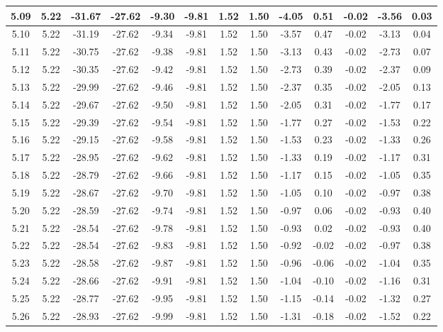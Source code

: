 \begin{table}[htbp]
\begin{adjustbox}{angle=90}
\begin{tabular}{|c|c|c|c|c|c|c|c|c|c|c|c|c|}
 5.09 & 5.22 & -31.67 & -27.62 & -9.30 & -9.81 & 1.52 & 1.50 & -4.05 & 0.51 & -0.02 & -3.56 & 0.03\\ \hline
 5.10 & 5.22 & -31.19 & -27.62 & -9.34 & -9.81 & 1.52 & 1.50 & -3.57 & 0.47 & -0.02 & -3.13 & 0.04\\ \hline
 5.11 & 5.22 & -30.75 & -27.62 & -9.38 & -9.81 & 1.52 & 1.50 & -3.13 & 0.43 & -0.02 & -2.73 & 0.07\\ \hline
 5.12 & 5.22 & -30.35 & -27.62 & -9.42 & -9.81 & 1.52 & 1.50 & -2.73 & 0.39 & -0.02 & -2.37 & 0.09\\ \hline
 5.13 & 5.22 & -29.99 & -27.62 & -9.46 & -9.81 & 1.52 & 1.50 & -2.37 & 0.35 & -0.02 & -2.05 & 0.13\\ \hline
 5.14 & 5.22 & -29.67 & -27.62 & -9.50 & -9.81 & 1.52 & 1.50 & -2.05 & 0.31 & -0.02 & -1.77 & 0.17\\ \hline
 5.15 & 5.22 & -29.39 & -27.62 & -9.54 & -9.81 & 1.52 & 1.50 & -1.77 & 0.27 & -0.02 & -1.53 & 0.22\\ \hline
 5.16 & 5.22 & -29.15 & -27.62 & -9.58 & -9.81 & 1.52 & 1.50 & -1.53 & 0.23 & -0.02 & -1.33 & 0.26\\ \hline
 5.17 & 5.22 & -28.95 & -27.62 & -9.62 & -9.81 & 1.52 & 1.50 & -1.33 & 0.19 & -0.02 & -1.17 & 0.31\\ \hline
 5.18 & 5.22 & -28.79 & -27.62 & -9.66 & -9.81 & 1.52 & 1.50 & -1.17 & 0.15 & -0.02 & -1.05 & 0.35\\ \hline
 5.19 & 5.22 & -28.67 & -27.62 & -9.70 & -9.81 & 1.52 & 1.50 & -1.05 & 0.10 & -0.02 & -0.97 & 0.38\\ \hline
 5.20 & 5.22 & -28.59 & -27.62 & -9.74 & -9.81 & 1.52 & 1.50 & -0.97 & 0.06 & -0.02 & -0.93 & 0.40\\ \hline
 5.21 & 5.22 & -28.54 & -27.62 & -9.78 & -9.81 & 1.52 & 1.50 & -0.93 & 0.02 & -0.02 & -0.93 & 0.40\\ \hline
 5.22 & 5.22 & -28.54 & -27.62 & -9.83 & -9.81 & 1.52 & 1.50 & -0.92 & -0.02 & -0.02 & -0.97 & 0.38\\ \hline
 5.23 & 5.22 & -28.58 & -27.62 & -9.87 & -9.81 & 1.52 & 1.50 & -0.96 & -0.06 & -0.02 & -1.04 & 0.35\\ \hline
 5.24 & 5.22 & -28.66 & -27.62 & -9.91 & -9.81 & 1.52 & 1.50 & -1.04 & -0.10 & -0.02 & -1.16 & 0.31\\ \hline
 5.25 & 5.22 & -28.77 & -27.62 & -9.95 & -9.81 & 1.52 & 1.50 & -1.15 & -0.14 & -0.02 & -1.32 & 0.27\\ \hline
 5.26 & 5.22 & -28.93 & -27.62 & -9.99 & -9.81 & 1.52 & 1.50 & -1.31 & -0.18 & -0.02 & -1.52 & 0.22\\ \hline

\end{tabular}
\end{adjustbox}
\end{table}
